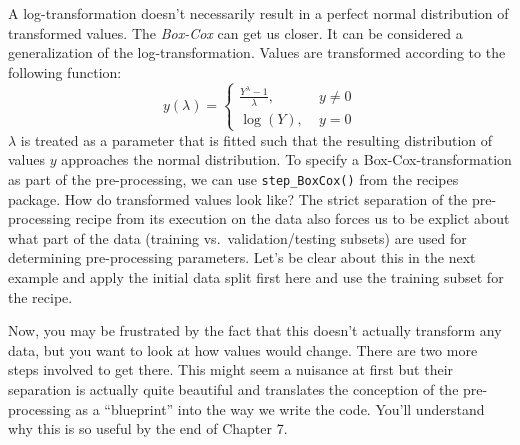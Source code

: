 \documentclass[
]{book}
\newenvironment{Shaded}{\begin{snugshade}}{\end{snugshade}}
\newcommand{\DataTypeTok}[1]{\textcolor[rgb]{0.13,0.29,0.53}{#1}}
\newcommand{\FloatTok}[1]{\textcolor[rgb]{0.00,0.00,0.81}{#1}}
\newcommand{\KeywordTok}[1]{\textcolor[rgb]{0.13,0.29,0.53}{\textbf{#1}}}
\newcommand{\NormalTok}[1]{#1}
\newcommand{\OperatorTok}[1]{\textcolor[rgb]{0.81,0.36,0.00}{\textbf{#1}}}
\newcommand{\StringTok}[1]{\textcolor[rgb]{0.31,0.60,0.02}{#1}}
\begin{document}
A log-transformation doesn't necessarily result in a perfect normal distribution of transformed values. The \emph{Box-Cox} can get us closer. It can be considered a generalization of the log-transformation. Values are transformed according to the following function:
\[
y(\lambda) = \begin{cases}  
\frac{Y^\lambda-1}{\lambda}, &\; y \neq 0\\ 
\log(Y),                     &\; y = 0
\end{cases}
\]
\(\lambda\) is treated as a parameter that is fitted such that the resulting distribution of values \(y\) approaches the normal distribution. To specify a Box-Cox-transformation as part of the pre-processing, we can use \texttt{step\_BoxCox()} from the recipes package. How do transformed values look like? The strict separation of the pre-processing recipe from its execution on the data also forces us to be explict about what part of the data (training vs.~validation/testing subsets) are used for determining pre-processing parameters. Let's be clear about this in the next example and apply the initial data split first here and use the training subset for the recipe.

\begin{Shaded}
\end{Shaded}

Now, you may be frustrated by the fact that this doesn't actually transform any data, but you want to look at how values would change. There are two more steps involved to get there. This might seem a nuisance at first but their separation is actually quite beautiful and translates the conception of the pre-processing as a ``blueprint'' into the way we write the code. You'll understand why this is so useful by the end of Chapter 7.
\end{document}
